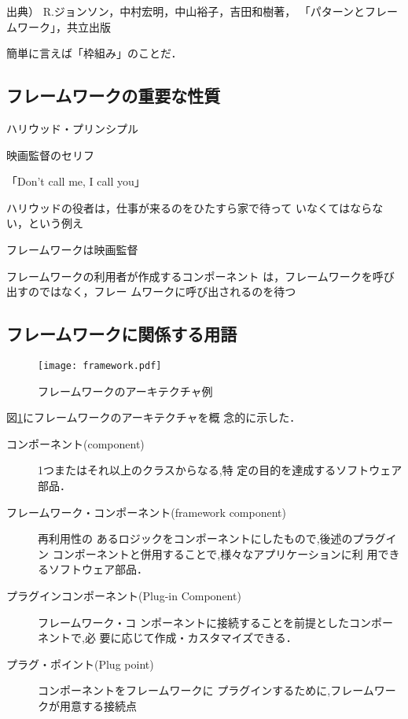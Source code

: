 \documentclass[a4j,papersize]{jsbook}
\begin{document}
 出典） R.ジョンソン，中村宏明，中山裕子，吉田和樹著，
「パターンとフレームワーク」，共立出版 

簡単に言えば「枠組み」のことだ．

\subsection{フレームワークの重要な性質}
ハリウッド・プリンシプル 

映画監督のセリフ 

「Don’t call me, I call you」 

 ハリウッドの役者は，仕事が来るのをひたすら家で待って
いなくてはならない，という例え 

フレームワークは映画監督 

フレームワークの利用者が作成するコンポーネント
は，フレームワークを呼び出すのではなく，フレー
ムワークに呼び出されるのを待つ 

\subsection{フレームワークに関係する用語}

\begin{figure}
 \begin{center}
  \texttt{[image: framework.pdf]}
  \caption{フレームワークのアーキテクチャ例}\label{fig:framework_architecture}
 \end{center}
\end{figure}

図\ref{fig:framework_architecture}にフレームワークのアーキテクチャを概
念的に示した．

\begin{description}
 \item[コンポーネント(component)] 1つまたはそれ以上のクラスからなる,特
	    定の目的を達成するソフトウェア部品．
 \item[フレームワーク・コンポーネント(framework component)] 再利用性の
	    あるロジックをコンポーネントにしたもので,後述のプラグイン
	    コンポーネントと併用することで,様々なアプリケーションに利
	    用できるソフトウェア部品．
 \item[プラグインコンポーネント(Plug-in Component)] フレームワーク・コ
	    ンポーネントに接続することを前提としたコンポーネントで,必
	    要に応じて作成・カスタマイズできる．
 \item[プラグ・ポイント(Plug point)] コンポーネントをフレームワークに
	    プラグインするために,フレームワークが用意する接続点
\end{description}
\end{document}
